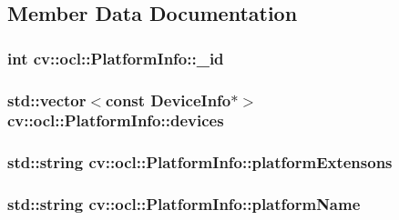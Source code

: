 \subsection{Member Data Documentation}
\hypertarget{structcv_1_1ocl_1_1PlatformInfo_a1b4f06d8d3562071821d2da60ad27362}{
\subsubsection[{\-\_\-id}]{\setlength{\rightskip}{0pt plus 5cm}int cv\-::ocl\-::\-Platform\-Info\-::\-\_\-id}}\label{structcv_1_1ocl_1_1PlatformInfo_a1b4f06d8d3562071821d2da60ad27362}
\hypertarget{structcv_1_1ocl_1_1PlatformInfo_aca552d96ff3ed8f1ee1d090b0ba881b1}{
\subsubsection[{devices}]{\setlength{\rightskip}{0pt plus 5cm}std\-::vector$<$const {\bf Device\-Info}$\ast$$>$ cv\-::ocl\-::\-Platform\-Info\-::devices}}\label{structcv_1_1ocl_1_1PlatformInfo_aca552d96ff3ed8f1ee1d090b0ba881b1}
\hypertarget{structcv_1_1ocl_1_1PlatformInfo_a5ab150ac5127abf11ab9e74b2f556404}{
\subsubsection[{platform\-Extensons}]{\setlength{\rightskip}{0pt plus 5cm}std\-::string cv\-::ocl\-::\-Platform\-Info\-::platform\-Extensons}}\label{structcv_1_1ocl_1_1PlatformInfo_a5ab150ac5127abf11ab9e74b2f556404}
\hypertarget{structcv_1_1ocl_1_1PlatformInfo_a22de70e1ad52a139dd76c63cf379910c}{
\subsubsection[{platform\-Name}]{\setlength{\rightskip}{0pt plus 5cm}std\-::string cv\-::ocl\-::\-Platform\-Info\-::platform\-Name}}\label{structcv_1_1ocl_1_1PlatformInfo_a22de70e1ad52a139dd76c63cf379910c}

